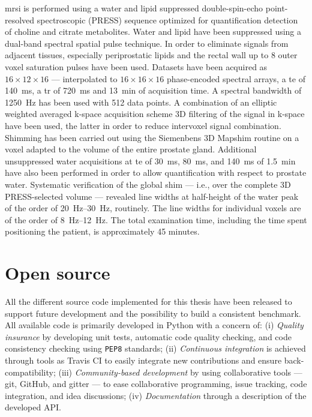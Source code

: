 \ac{mrsi} is performed using a water and lipid suppressed double-spin-echo point-resolved spectroscopic (PRESS) sequence optimized for quantification detection of choline and citrate metabolites.
Water and lipid have been suppressed using a dual-band spectral spatial pulse technique.
In order to eliminate signals from adjacent tissues, especially periprostatic lipids and the rectal wall up to 8 outer voxel saturation pulses have been used.
Datasets have been acquired as $16 \times 12 \times 16$ --- interpolated to $16 \times 16 \times 16$ phase-encoded spectral arrays, a \ac{te} of \SI{140}{\ms}, a \ac{tr} of \SI{720}{\ms} and \SI{13}{\minute} of acquisition time.
A spectral bandwidth of \SI{1250}{\hertz} has been used with 512 data points.
A combination of an elliptic weighted averaged k-space acquisition scheme 3D filtering of the signal in k-space have been used, the latter in order to reduce intervoxel signal combination.
Shimming has been carried out using the Siemenbens 3D Mapshim routine on a voxel adapted to the volume of the entire prostate gland.
Additional unsuppressed water acquisitions at \ac{te} of \SI{30}{\ms}, \SI{80}{\ms}, and \SI{140}{\ms} of \SI{1.5}{\minute} have also been performed in order to allow quantification with respect to prostate water.
Systematic verification of the global shim --- i.e., over the complete 3D PRESS-selected volume --- revealed line widths at half-height of the water peak of the order of \SIrange{20}{30}{\hertz}, routinely.
The line widths for individual voxels are of the order of \SIrange{8}{12}{\hertz}.
The total examination time, including the time spent positioning the patient, is approximately 45 minutes.

\section{Open source}

All the different source code implemented for this thesis have been released to support future development and the possibility to build a consistent benchmark.
All available code is primarily developed in Python with a concern of:
(i) \emph{Quality insurance} by developing unit tests, automatic code quality checking, and code consistency checking using \texttt{PEP8} standards;
(ii) \emph{Continuous integration} is achieved through tools as Travis CI to easily integrate new contributions and ensure back-compatibility;
(iii) \emph{Community-based development} by using collaborative tools --- git, GitHub, and gitter --- to ease collaborative programming, issue tracking, code integration, and idea discussions;
(iv) \emph{Documentation} through a description of the developed API.


